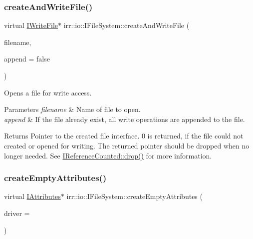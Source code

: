 \subsubsection{\texorpdfstring{create\+And\+Write\+File()}{createAndWriteFile()}}
{\footnotesize\ttfamily virtual \hyperlink{classirr_1_1io_1_1IWriteFile}{I\+Write\+File}$\ast$ irr\+::io\+::\+I\+File\+System\+::create\+And\+Write\+File (\begin{DoxyParamCaption}\item[{const \hyperlink{namespaceirr_1_1io_ab1bdc45edb3f94d8319c02bc0f840ee1}{path} \&}]{filename,  }\item[{bool}]{append = {\ttfamily false} }\end{DoxyParamCaption})\hspace{0.3cm}{\ttfamily [pure virtual]}}



Opens a file for write access. 


\begin{DoxyParams}{Parameters}
{\em filename} & Name of file to open. \\
\hline
{\em append} & If the file already exist, all write operations are appended to the file. \\
\hline
\end{DoxyParams}
\begin{DoxyReturn}{Returns}
Pointer to the created file interface. 0 is returned, if the file could not created or opened for writing. The returned pointer should be dropped when no longer needed. See \hyperlink{classirr_1_1IReferenceCounted_a03856a09355b89d178090c4a5f738543}{I\+Reference\+Counted\+::drop()} for more information. 
\end{DoxyReturn}
\mbox{\label{classirr_1_1io_1_1IFileSystem_a50f91cd88b926751367dac153c1cefd2}} 
\subsubsection{\texorpdfstring{create\+Empty\+Attributes()}{createEmptyAttributes()}}
{\footnotesize\ttfamily virtual \hyperlink{classirr_1_1io_1_1IAttributes}{I\+Attributes}$\ast$ irr\+::io\+::\+I\+File\+System\+::create\+Empty\+Attributes (\begin{DoxyParamCaption}\item[{\hyperlink{classirr_1_1video_1_1IVideoDriver}{video\+::\+I\+Video\+Driver} $\ast$}]{driver = {} }\end{DoxyParamCaption})\hspace{0.3cm}{\ttfamily [pure virtual]}}



